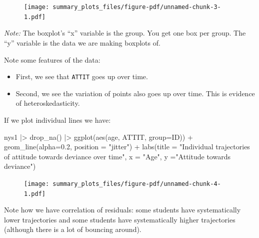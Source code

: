 \documentclass[
  letterpaper,
  DIV=11,
  numbers=noendperiod]{scrreprt}
\newenvironment{Shaded}{\begin{snugshade}}{\end{snugshade}}
\newcommand{\AttributeTok}[1]{\textcolor[rgb]{0.49,0.56,0.16}{#1}}
\newcommand{\FloatTok}[1]{\textcolor[rgb]{0.25,0.63,0.44}{#1}}
\newcommand{\FunctionTok}[1]{\textcolor[rgb]{0.02,0.16,0.49}{#1}}
\newcommand{\NormalTok}[1]{\textcolor[rgb]{0.00,0.44,0.13}{#1}}
\newcommand{\SpecialCharTok}[1]{\textcolor[rgb]{0.25,0.44,0.63}{#1}}
\newcommand{\StringTok}[1]{\textcolor[rgb]{0.25,0.44,0.63}{#1}}
\providecommand{\tightlist}{%
  \setlength{\itemsep}{0pt}\setlength{\parskip}{0pt}}\usepackage{longtable,booktabs,array}
\begin{document}
\begin{figure}[H]

{\centering \texttt{[image: summary\_plots\_files/figure-pdf/unnamed-chunk-3-1.pdf]}

}

\end{figure}

\emph{Note:} The boxplot's ``x'' variable is the group. You get one box
per group. The ``y'' variable is the data we are making boxplots of.

Note some features of the data:

\begin{itemize}
\tightlist
\item
  First, we see that \texttt{ATTIT} goes up over time.
\item
  Second, we see the variation of points also goes up over time. This is
  evidence of heteroskedasticity.
\end{itemize}

If we plot individual lines we have:

\begin{Shaded}
\begin{Highlighting}[]
\NormalTok{nys1 }\SpecialCharTok{|\textgreater{}} 
  \FunctionTok{drop\_na}\NormalTok{() }\SpecialCharTok{|\textgreater{}} 
  \FunctionTok{ggplot}\NormalTok{(}\FunctionTok{aes}\NormalTok{(age, ATTIT, }\AttributeTok{group=}\NormalTok{ID)) }\SpecialCharTok{+}
    \FunctionTok{geom\_line}\NormalTok{(}\AttributeTok{alpha=}\FloatTok{0.2}\NormalTok{, }\AttributeTok{position =} \StringTok{"jitter"}\NormalTok{) }\SpecialCharTok{+} 
    \FunctionTok{labs}\NormalTok{(}\AttributeTok{title =} \StringTok{"Individual trajectories of attitude towards deviance over time"}\NormalTok{,}
         \AttributeTok{x =} \StringTok{"Age"}\NormalTok{,}
         \AttributeTok{y =}\StringTok{"Attitude towards deviance"}\NormalTok{)}
\end{Highlighting}
\end{Shaded}

\begin{figure}[H]

{\centering \texttt{[image: summary\_plots\_files/figure-pdf/unnamed-chunk-4-1.pdf]}

}

\end{figure}

Note how we have correlation of residuals: some students have
systematically lower trajectories and some students have systematically
higher trajectories (although there is a lot of bouncing around).
\end{document}
